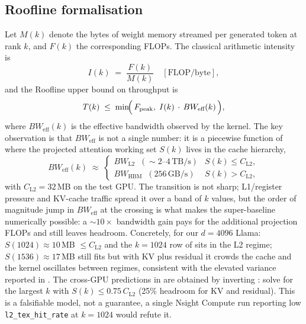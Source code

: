 \documentclass[11pt]{article}
\begin{document}
\subsection{Roofline formalisation}
\label{sec:roofline}
Let $M(k)$ denote the bytes of weight memory streamed per generated token at
rank $k$, and $F(k)$ the corresponding FLOPs.  The classical arithmetic
intensity is
\begin{equation}
I(k)\;=\;\frac{F(k)}{M(k)}\quad[\text{FLOP/byte}],
\label{eq:ai}
\end{equation}
and the Roofline upper bound on throughput
\cite{williams2009roofline} is
\begin{equation}
T(k)\;\le\;\min\!\Bigl(\,F_\text{peak},\; I(k)\,\cdot\,BW_\text{eff}(k)\,\Bigr),
\label{eq:roofline}
\end{equation}
where $BW_\text{eff}(k)$ is the effective bandwidth observed by the kernel.
The key observation is that $BW_\text{eff}$ is not a single number: it is a
piecewise function of where the projected attention working set $S(k)$ lives
in the cache hierarchy,
\begin{equation}
BW_\text{eff}(k)\;\approx\;
\begin{cases}
BW_\text{L2}\;\;(\sim\!2\text{--}4\,\text{TB/s}) & S(k)\le C_\text{L2},\\
BW_\text{HBM}\;\;(256\,\text{GB/s}) & S(k)>C_\text{L2},
\end{cases}
\label{eq:bweff}
\end{equation}
with $C_\text{L2}=32$\,MB on the test GPU.  The transition is not sharp;
L1/register pressure and KV-cache traffic spread it over a band of $k$
values, but the order of magnitude jump in $BW_\text{eff}$ at the
crossing is what makes the super-baseline numerically possible: a $\sim\!10\times$
bandwidth gain pays for the additional projection FLOPs and still leaves
headroom.  Concretely, for our $d{=}4096$ Llama:
$S(1024)\!\approx\!10$\,MB $\le C_\text{L2}$ and the $k{=}1024$ row of
 sits in the L2 regime; $S(1536)\!\approx\!17$\,MB still
fits but with KV plus residual it crowds the cache and the kernel oscillates
between regimes, consistent with the elevated variance reported in
.  The cross-GPU predictions in  are
obtained by inverting : solve for the largest $k$ with
$S(k)\le 0.75\,C_\text{L2}$ (25\% headroom for KV and residual).
This is a falsifiable model, not a guarantee, a single Nsight Compute
run reporting low \texttt{l2\_tex\_hit\_rate} at $k{=}1024$ would refute it.
\end{document}
